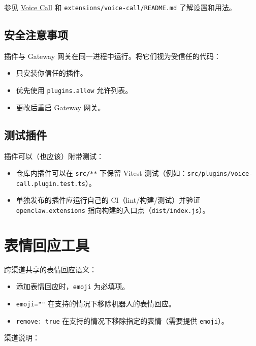 参见 \href{/plugins/voice-call}{Voice Call} 和 \texttt{extensions/voice-call/README.md} 了解设置和用法。

\subsection{安全注意事项}


插件与 Gateway 网关在同一进程中运行。将它们视为受信任的代码：

\begin{itemize}
  \item 只安装你信任的插件。
  \item 优先使用 \texttt{plugins.allow} 允许列表。
  \item 更改后重启 Gateway 网关。
\end{itemize}


\subsection{测试插件}


插件可以（也应该）附带测试：

\begin{itemize}
  \item 仓库内插件可以在 \texttt{src/**} 下保留 Vitest 测试（例如：\texttt{src/plugins/voice-call.plugin.test.ts}）。
  \item 单独发布的插件应运行自己的 CI（lint/构建/测试）并验证 \texttt{openclaw.extensions} 指向构建的入口点（\texttt{dist/index.js}）。
\end{itemize}



\clearpage

\section{表情回应工具}


跨渠道共享的表情回应语义：

\begin{itemize}
  \item 添加表情回应时，\texttt{emoji} 为必填项。
  \item \texttt{emoji=""} 在支持的情况下移除机器人的表情回应。
  \item \texttt{remove: true} 在支持的情况下移除指定的表情（需要提供 \texttt{emoji}）。
\end{itemize}


渠道说明：

